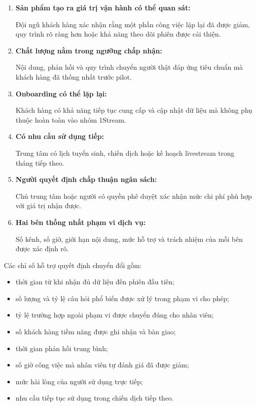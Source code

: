 \begin{enumerate}
    \item \textbf{Sản phẩm tạo ra giá trị vận hành có thể quan sát:}

    Đội ngũ khách hàng xác nhận rằng một phần công việc lặp lại đã được giảm, quy trình rõ ràng hơn hoặc khả năng theo dõi phiên được cải thiện.

    \item \textbf{Chất lượng nằm trong ngưỡng chấp nhận:}

    Nội dung, phản hồi và quy trình chuyển người thật đáp ứng tiêu chuẩn mà khách hàng đã thống nhất trước pilot.

    \item \textbf{Onboarding có thể lặp lại:}

    Khách hàng có khả năng tiếp tục cung cấp và cập nhật dữ liệu mà không phụ thuộc hoàn toàn vào nhóm 1Stream.

    \item \textbf{Có nhu cầu sử dụng tiếp:}

    Trung tâm có lịch tuyển sinh, chiến dịch hoặc kế hoạch livestream trong tháng tiếp theo.

    \item \textbf{Người quyết định chấp thuận ngân sách:}

    Chủ trung tâm hoặc người có quyền phê duyệt xác nhận mức chi phí phù hợp với giá trị nhận được.

    \item \textbf{Hai bên thống nhất phạm vi dịch vụ:}

    Số kênh, số giờ, giới hạn nội dung, mức hỗ trợ và trách nhiệm của mỗi bên được xác định rõ.
\end{enumerate}

Các chỉ số hỗ trợ quyết định chuyển đổi gồm:

\begin{itemize}
    \item thời gian từ khi nhận đủ dữ liệu đến phiên đầu tiên;
    \item số lượng và tỷ lệ câu hỏi phổ biến được xử lý trong phạm vi cho phép;
    \item tỷ lệ trường hợp ngoài phạm vi được chuyển đúng cho nhân viên;
    \item số khách hàng tiềm năng được ghi nhận và bàn giao;
    \item thời gian phản hồi trung bình;
    \item số giờ công việc mà nhân viên tự đánh giá đã được giảm;
    \item mức hài lòng của người sử dụng trực tiếp;
    \item nhu cầu tiếp tục sử dụng trong chiến dịch tiếp theo.
\end{itemize}

